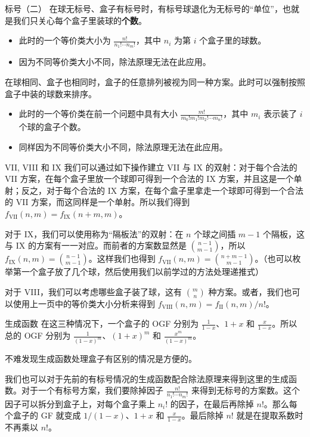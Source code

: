 \begin{frame}{标号（二）}
    在球无标号、盒子有标号时，有标号球退化为无标号的“单位”，也就是我们只关心每个盒子里装球的\textbf{个数}。
    \begin{itemize}
        \item 此时的一个等价类大小为 $\frac{n!}{n_1!\cdots n_m!}$，其中 $n_i$ 为第 $i$ 个盒子里的球数。
        \item 因为不同等价类大小不同，除法原理无法在此应用。
    \end{itemize} 

    在球相同、盒子也相同时，盒子的任意排列被视为同一种方案。此时可以强制按照盒子中装的球数来排序。
    \begin{itemize}
        \item 此时的一个等价类在前一个问题中具有大小 $\frac{m!}{m_0!m_1!m_2!\cdots m_n!}$，其中 $m_i$ 表示装了 $i$ 个球的盒子个数。
        \item 同样因为不同等价类大小不同，除法原理无法在此应用。
    \end{itemize}
\end{frame}
\begin{frame}{VII, VIII 和 IX}
    我们可以通过如下操作建立 VII 与 IX 的双射：对于每个合法的 VII 方案，在每个盒子里放一个球即可得到一个合法的 IX 方案，并且这是一个单射；反之，对于每个合法的 IX 方案，在每个盒子里拿走一个球即可得到一个合法的 VII 方案，而这同样是一个单射。所以我们得到 $f_{\mathrm{VII}}(n,m)=f_{\mathrm{IX}}(n+m,m)$。

    对于 IX，我们可以使用称为“隔板法”的双射：在 $n$ 个球之间插 $m-1$ 个隔板，这与 IX 的方案有一一对应。而前者的方案数显然是 $\binom{n-1}{m-1}$，所以 $f_{\mathrm{IX}}(n,m)=\binom{n-1}{m-1}$。这样我们也得到 $f_{\mathrm{VII}}(n,m)=\binom{n+m-1}{m-1}$。（也可以枚举第一个盒子放了几个球，然后使用我们以前学过的方法处理递推式）

    对于 VIII，我们可以考虑哪些盒子装了球，这有 $\binom{m}{n}$ 种方案。或者，我们也可以使用上一页中的等价类大小分析来得到 $f_{\mathrm{VIII}}(n,m)=f_{\mathrm{II}}(n,m)/n!$。
\end{frame}
\begin{frame}{生成函数}
    在这三种情况下，一个盒子的 OGF 分别为 $\frac{1}{1-x}$、$1+x$ 和 $\frac{x}{1-x}$。所以总的 OGF 分别为 $\frac{1}{(1-x)^m}$、$(1+x)^m$ 和 $\frac{x^m}{(1-x)^m}$。

    不难发现生成函数处理盒子有区别的情况是方便的。

    我们也可以对于先前的有标号情况的生成函数配合除法原理来得到这里的生成函数。对于一个有标号方案，我们要除掉因子 $\frac{n!}{n_1!\cdots n_m!}$ 来得到无标号的方案数。这个因子可以拆分到盒子上，对每个盒子乘上 $n_i!$ 的因子，在最后再除掉 $n!$。那么每个盒子的 GF 就变成 $1/(1-x)$、$1+x$ 和 $\frac{x}{1-x}$。最后除掉 $n!$ 就是在提取系数时不再乘以 $n!$。
\end{frame}
